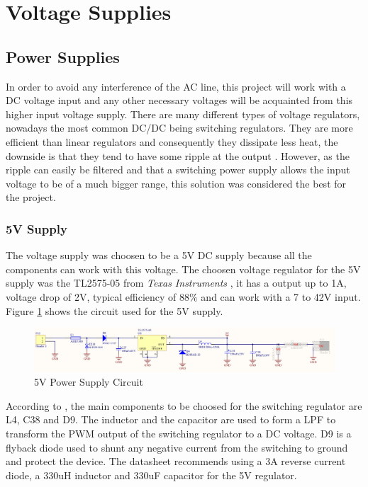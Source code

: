 \section{Voltage Supplies}\label{sec:voltage-supplies}

	\subsection{Power Supplies}\label{ssec:power-supplies}
		In order to avoid any interference of the AC line, this project will work with a DC voltage input and any other necessary voltages will be acquainted from this higher input voltage supply. There are many different types of voltage regulators, nowadays the most common DC/DC being switching regulators. They are more efficient than linear regulators and consequently they dissipate less heat, the downside is that they tend to have some ripple at the output \cite{schweber2017}. However, as the ripple can easily be filtered and that a switching power supply allows the input voltage to be of a much bigger range, this solution was considered the best for the project. 

		\subsubsection{5V Supply}\label{sssec:5v-supply}
			The voltage supply was choosen to be a 5V DC supply because all the components can work with this voltage. The choosen voltage regulator for the 5V supply was the TL2575-05 from \textit{Texas Instruments} \cite{tl2575-05-datasheet}, it has a output up to 1A, voltage drop of 2V, typical efficiency of 88$\%$ and can work with a 7 to 42V input. Figure \ref{fig:tl2575-05-circuit} shows the circuit used for the 5V supply.

			\begin{figure}[htbp]
				\centering
					\includegraphics[width=1\textwidth]{figuras/fig-tl2575-05-circuit.png}
				\caption{5V Power Supply Circuit}
				\label{fig:tl2575-05-circuit}
			\end{figure}

			According to \cite{tl2575-05-datasheet}, the main components to be choosed for the switching regulator are L4, C38 and D9. The inductor and the capacitor are used to form a LPF to transform the PWM output of the switching regulator to a DC voltage. D9 is a flyback diode used to shunt any negative current from the switching to ground and protect the device. The datasheet recommends using a 3A reverse current diode, a 330uH inductor and 330uF capacitor for the 5V regulator.

